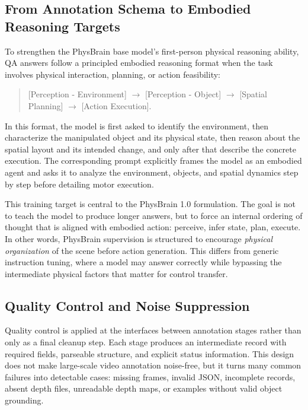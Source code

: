 \documentclass{llmxive}
\providecommand{\infobox}[1]{
    \begin{tcolorbox}[
        width=0.97\linewidth,
        center,
        colback=amappaleblue!45!white,
        colframe=amapblue!75!black,
        arc=5pt,
        boxsep=4pt,
        left=4pt,
        right=4pt,
        top=3pt,
        bottom=4pt,
        boxrule=0.8pt,
    ]
        \begin{minipage}{0.98\linewidth}
        \small\raggedright
        #1
        \end{minipage}
    \end{tcolorbox}
}
\begin{document}
\subsection{From Annotation Schema to Embodied Reasoning Targets}

To strengthen the PhysBrain base model's first-person physical reasoning ability, QA answers follow a principled embodied reasoning format when the task involves physical interaction, planning, or action feasibility:

\infobox{
\begin{quote}
\small
[Perception - Environment] $\rightarrow$ [Perception - Object] $\rightarrow$ [Spatial Planning] $\rightarrow$ [Action Execution].
\end{quote}
}
In this format, the model is first asked to identify the environment, then characterize the manipulated object and its physical state, then reason about the spatial layout and its intended change, and only after that describe the concrete execution. The corresponding prompt explicitly frames the model as an embodied agent and asks it to analyze the environment, objects, and spatial dynamics step by step before detailing motor execution.

This training target is central to the PhysBrain 1.0 formulation. The goal is not to teach the model to produce longer answers, but to force an internal ordering of thought that is aligned with embodied action: perceive, infer state, plan, execute. In other words, PhysBrain supervision is structured to encourage \emph{physical organization} of the scene before action generation. This differs from generic instruction tuning, where a model may answer correctly while bypassing the intermediate physical factors that matter for control transfer.

\subsection{Quality Control and Noise Suppression}

Quality control is applied at the interfaces between annotation stages rather than only as a final cleanup step. Each stage produces an intermediate record with required fields, parseable structure, and explicit status information. This design does not make large-scale video annotation noise-free, but it turns many common failures into detectable cases: missing frames, invalid JSON, incomplete records, absent depth files, unreadable depth maps, or examples without valid object grounding.
\end{document}
